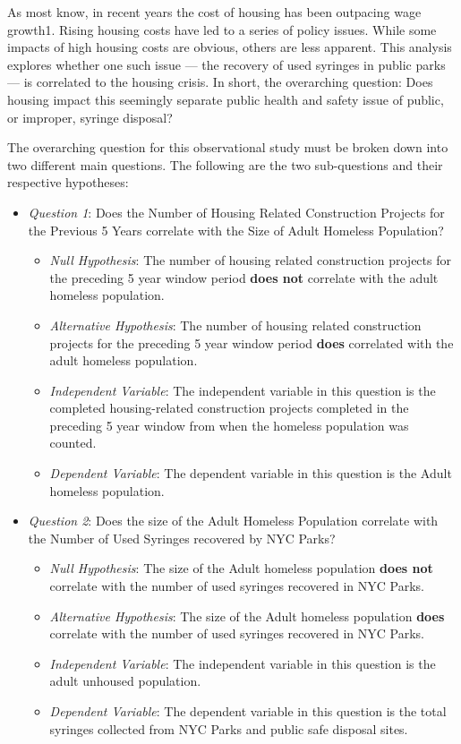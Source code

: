 \documentclass[
]{article}
\providecommand{\tightlist}{%
  \setlength{\itemsep}{0pt}\setlength{\parskip}{0pt}}
\begin{document}
As most know, in recent years the cost of housing has been outpacing
wage growth1. Rising housing costs have led to a series of policy
issues. While some impacts of high housing costs are obvious, others are
less apparent. This analysis explores whether one such issue --- the
recovery of used syringes in public parks --- is correlated to the
housing crisis. In short, the overarching question: Does housing impact
this seemingly separate public health and safety issue of public, or
improper, syringe disposal?

The overarching question for this observational study must be broken
down into two different main questions. The following are the two
sub-questions and their respective hypotheses:

\begin{itemize}
\tightlist
\item
  \emph{Question 1}: Does the Number of Housing Related Construction
  Projects for the Previous 5 Years correlate with the Size of Adult
  Homeless Population?

  \begin{itemize}
  \tightlist
  \item
    \emph{Null Hypothesis}: The number of housing related construction
    projects for the preceding 5 year window period \textbf{does not}
    correlate with the adult homeless population.
  \item
    \emph{Alternative Hypothesis}: The number of housing related
    construction projects for the preceding 5 year window period
    \textbf{does} correlated with the adult homeless population.
  \item
    \emph{Independent Variable}: The independent variable in this
    question is the completed housing-related construction projects
    completed in the preceding 5 year window from when the homeless
    population was counted.
  \item
    \emph{Dependent Variable}: The dependent variable in this question
    is the Adult homeless population.
  \end{itemize}
\item
  \emph{Question 2}: Does the size of the Adult Homeless Population
  correlate with the Number of Used Syringes recovered by NYC Parks?

  \begin{itemize}
  \tightlist
  \item
    \emph{Null Hypothesis}: The size of the Adult homeless population
    \textbf{does not} correlate with the number of used syringes
    recovered in NYC Parks.
  \item
    \emph{Alternative Hypothesis}: The size of the Adult homeless
    population \textbf{does} correlate with the number of used syringes
    recovered in NYC Parks.
  \item
    \emph{Independent Variable}: The independent variable in this
    question is the adult unhoused population.
  \item
    \emph{Dependent Variable}: The dependent variable in this question
    is the total syringes collected from NYC Parks and public safe
    disposal sites.
  \end{itemize}
\end{itemize}
\end{document}
